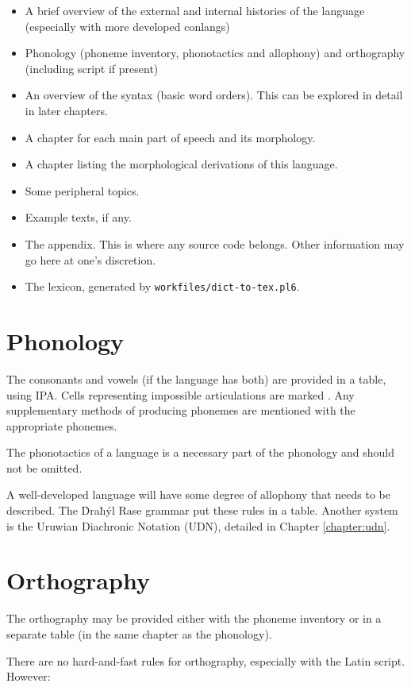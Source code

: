 \documentclass{book}
\begin{document}
\begin{itemize}
  \item A brief overview of the external and internal histories of the language (especially with more developed conlangs)
  \item Phonology (phoneme inventory, phonotactics and allophony) and orthography (including script if present)
  \item An overview of the syntax (basic word orders). This can be explored in detail in later chapters.
  \item A chapter for each main part of speech and its morphology.
  \item A chapter listing the morphological derivations of this language.
  \item Some peripheral topics.
  \item Example texts, if any.
  \item The appendix. This is where any source code belongs. Other information may go here at one's discretion.
  \item The lexicon, generated by \texttt{workfiles/dict-to-tex.pl6}.
\end{itemize}

\section{Phonology}

The consonants and vowels (if the language has both) are provided in a table, using IPA. Cells representing impossible articulations are marked \texttt{}. Any supplementary methods of producing phonemes are mentioned with the appropriate phonemes.

The phonotactics of a language is a necessary part of the phonology and should not be omitted.

A well-developed language will have some degree of allophony that needs to be described. The Ḋraħýl Rase grammar put these rules in a table. Another system is the Uruwian Diachronic Notation (UDN), detailed in Chapter \ref{chapter:udn}.

\section{Orthography}

The orthography may be provided either with the phoneme inventory or in a separate table (in the same chapter as the phonology).

There are no hard-and-fast rules for orthography, especially with the Latin script. However:
\end{document}

